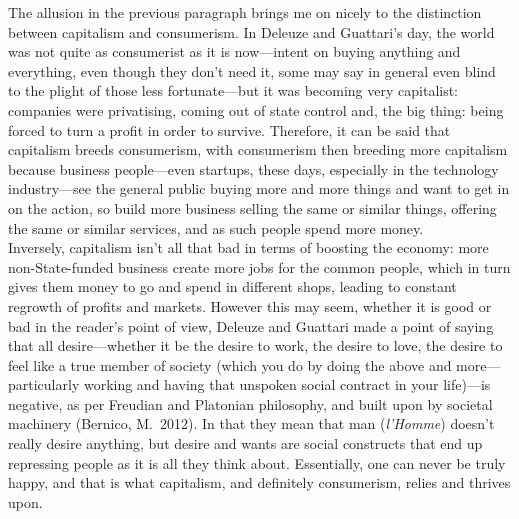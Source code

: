 \documentclass[12pt,a4paper]{article}
\begin{document}
The allusion in the previous paragraph brings me on nicely to the
distinction between capitalism and consumerism. In Deleuze and
Guattari's day, the world was not quite as consumerist as it is
now---intent on buying anything and everything, even though they don't
need it, some may say in general even blind to the plight of those
less fortunate---but it was becoming very capitalist: companies were
privatising, coming out of state control and, the big thing: being
forced to turn a profit in order to survive. Therefore, it can be said
that capitalism breeds consumerism, with consumerism then breeding more
capitalism because business people---even startups, these days,
especially in the technology industry---see the general public buying
more and more things and want to get in on the action, so build more
business selling the same or similar things, offering the same or
similar services, and as such people spend more money.\\

Inversely, capitalism isn't all that bad in terms of boosting the
economy: more non-State-funded business create more jobs for the
common people, which in turn gives them money to go and spend in
different shops, leading to constant regrowth of profits and markets.
However this may seem, whether it is good or bad in the reader's point
of view, Deleuze and Guattari made a point of saying that all
desire---whether it be the desire to work, the desire to love, the
desire to feel like a true member of society (which you do by doing
the above and more---particularly working and having that unspoken
social contract in your life)---is negative, as per Freudian and
Platonian philosophy, and built upon by societal machinery (Bernico,
M.\, 2012). In that they mean that man (\textit{l'Homme}) doesn't
really desire anything, but desire and wants are social constructs
that end up repressing people as it is all they think about.
Essentially, one can never be truly happy, and that is what
capitalism, and definitely consumerism, relies and thrives upon.\\
\end{document}

